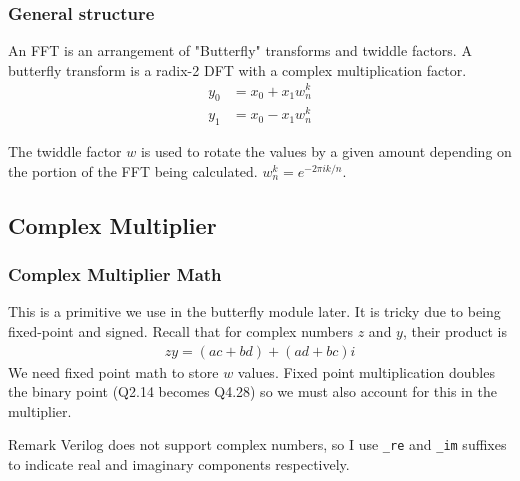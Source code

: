 \documentclass{beamer}
\begin{document}
\begin{frame}
	\frametitle{General structure}
	An FFT is an arrangement of "Butterfly" transforms and twiddle factors.
	A butterfly transform is a radix-2 DFT with a complex multiplication factor.
	\begin{align*}
		y_0 &= x_0 + x_1 w_n^k \\
		y_1 &= x_0 - x_1 w_n^k
	\end{align*}
	\begin{figure}
		\centering
	\end{figure}
	The twiddle factor $w$ is used to rotate the values by a given amount depending on the
	portion of the FFT being calculated. $w_n^k = e^{-2\pi i k / n}$.
\end{frame}

\subsection{Complex Multiplier}
\begin{frame}
	\frametitle{Complex Multiplier Math}
	This is a primitive we use in the butterfly module later. It is tricky due
	to being fixed-point and signed. \pause Recall that for complex numbers $z$ and $y$,
	their product is
	\begin{align*}
		z y = (ac + bd) + (ad + bc)i
	\end{align*}
	\pause
	We need fixed point math to store $w$ values. Fixed point multiplication doubles
	the binary point (Q2.14 becomes Q4.28) so we must also account for this in the multiplier.

	\begin{block}{Remark}
		Verilog does not support complex numbers, so I use \texttt{\_re} and
		\texttt{\_im} suffixes to indicate real and imaginary components 
		respectively.
	\end{block}
\end{frame}
\end{document}
